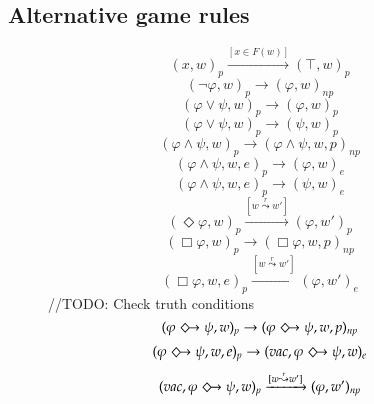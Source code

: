 \documentclass[a4paper,american]{paper}
\theoremstyle{definition}\newtheorem{definition}{Definition}
\begin{document}
\subsection{Alternative game rules}
\begin{figure}[H]
	\centering
	\begin{equation}
		(x ,w)_{p}\xrightarrow{[x\in F(w)]} (\top ,w)_{p}
	\end{equation}
	\begin{equation}
		(\neg\varphi ,w)_{p}\rightarrow (\varphi ,w)_{np}
	\end{equation}
	\begin{equation}
		(\varphi\vee\psi ,w)_{p}\rightarrow (\varphi ,w)_{p}
	\end{equation}
	\begin{equation}
		(\varphi\vee\psi ,w)_{p}\rightarrow (\psi ,w)_{p}
	\end{equation}
	\begin{equation}
		(\varphi\wedge\psi ,w)_{p}\rightarrow (\varphi\wedge\psi ,w,p)_{np}
	\end{equation}
	\begin{equation}
		(\varphi\wedge\psi ,w,e)_{p}\rightarrow (\varphi ,w)_{e}
	\end{equation}
	\begin{equation}
		(\varphi\wedge\psi ,w,e)_{p}\rightarrow (\psi ,w)_{e}
	\end{equation}
	\begin{equation}
		(\Diamond\varphi ,w)_{p}\xrightarrow{[w\overset{r}{\leadsto}w']} (\varphi ,w')_{p}
	\end{equation}
	\begin{equation}
		(\Box\varphi ,w)_{p}\rightarrow (\Box\varphi ,w,p)_{np}
	\end{equation}
	\begin{equation}
		(\Box\varphi ,w,e)_{p}\xrightarrow{[w\overset{r}{\leadsto}w']} (\varphi ,w')_{e}
	\end{equation}
	//TODO: Check truth conditions
	\begin{equation}
		(\varphi\Diamondright\psi ,w)_p\rightarrow (\varphi\Diamondright\psi ,w,p)_{np}
	\end{equation}
	\begin{equation}
		(\varphi\Diamondright\psi ,w,e)_{p}\rightarrow (vac, \varphi\Diamondright\psi ,w)_{e}
	\end{equation}
	\begin{equation}
		(vac, \varphi\Diamondright\psi ,w)_p\xrightarrow{[w\overset{r}{\leadsto}w']}(\varphi ,w')_{np}

\end{equation}
\end{figure}
\end{document}
